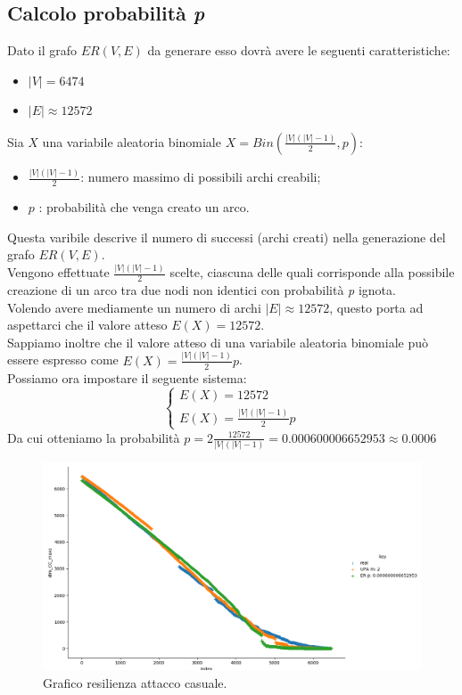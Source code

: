 \documentclass{article}
\begin{document}
\subsection*{Calcolo probabilità \textit{p}}
Dato il grafo $ER(V,E)$ da generare esso dovrà avere le seguenti caratteristiche:
\begin{itemize}
	\item $|V|= 6474$
	\item $|E| \approx 12572$
\end{itemize}
Sia $X$ una variabile aleatoria binomiale $X=Bin(\frac{|V|(|V|-1)}{2},p)$:
\begin{itemize}
	\item $\frac{|V|(|V|-1)}{2}$: numero massimo di possibili archi creabili;
	\item $p$ : probabilità che venga creato un arco.
\end{itemize} 
Questa varibile descrive il numero di successi (archi creati) nella generazione del grafo $ER(V,E)$.\\
Vengono effettuate $\frac{|V|(|V|-1)}{2}$ scelte, ciascuna delle quali corrisponde alla possibile creazione di un arco tra due nodi non identici con probabilità \textit{p} ignota.\\
Volendo avere mediamente un numero di archi $|E| \approx 12572$, questo porta ad aspettarci che il valore atteso $E(X) = 12572$.\\
Sappiamo inoltre che il valore atteso di una variabile aleatoria binomiale può essere espresso come  $E(X)=\frac{|V|(|V|-1)}{2}p$.\\
Possiamo ora impostare il seguente sistema:
$$
\begin{cases}
	E(X) = 12572               \\ 
	E(X)=\frac{|V|(|V|-1)}{2}p 
\end{cases}
$$
Da cui otteniamo la probabilità $p = 2\frac{12572}{|V|(|V|-1)} = 0.000600006652953 \approx 0.0006$
\begin{landscape}
	\begin{figure}
		\centering
		\includegraphics[width=1.8\textwidth]{../grafici/Figure_4}
		\caption{Grafico resilienza attacco casuale.}
	\end{figure}
\end{landscape}
\end{document}
